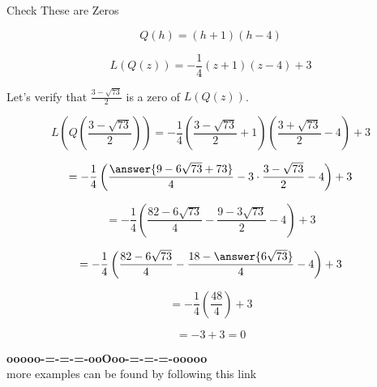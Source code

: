 \documentclass{ximera}
\begin{document}
\begin{claim} Check These are Zeros


\[   Q(h) = (h+1)(h-4)   \]


\[   L(Q(z)) = -\frac{1}{4} (z+1)(z-4) + 3   \]


Let's verify that $\frac{3 - \sqrt{73}}{2}$ is a zero of $L(Q(z))$.



\[   L \left( Q \left( \frac{3 - \sqrt{73}}{2} \right) \right) = -\frac{1}{4} \left( \frac{3 - \sqrt{73}}{2}+1 \right) \left( \frac{3 + \sqrt{73}}{2}-4 \right) + 3    \]



\[  = -\frac{1}{4} \left( \frac{\answer{9 - 6 \sqrt{73} + 73}}{4} - 3 \cdot \frac{3 - \sqrt{73}}{2} - 4 \right) + 3    \]


\[  = -\frac{1}{4} \left( \frac{82 - 6 \sqrt{73}}{4} - \frac{9 - 3 \sqrt{73}}{2} - 4 \right) + 3    \]


\[  = -\frac{1}{4} \left( \frac{82 - 6 \sqrt{73}}{4} - \frac{18 - \answer{6 \sqrt{73}}}{4} - 4 \right) + 3    \]


\[  = -\frac{1}{4} \left( \frac{48}{4} \right) + 3    \]


\[  = -3 + 3   = 0 \]


\end{claim}















\begin{center}
\textbf{\textcolor{green!50!black}{ooooo-=-=-=-ooOoo-=-=-=-ooooo}} \\

more examples can be found by following this link\\ 

\end{center}
\end{document}
